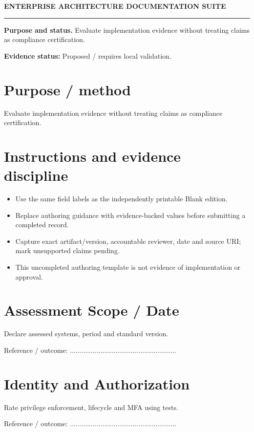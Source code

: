 \documentclass[10pt,letterpaper]{article}
\begin{document}
\begin{center}
{\large\bfseries\color{teal} ENTERPRISE ARCHITECTURE DOCUMENTATION SUITE}\par
{}\par
{}\par
\end{center}
\vspace{8pt}\hrule\vspace{12pt}
\textbf{Purpose and status.} Evaluate implementation evidence without treating claims as compliance certification.\par
\textbf{Evidence status:} Proposed / requires local validation.\par
\section{Purpose / method}
Evaluate implementation evidence without treating claims as compliance certification.\par
\section{Instructions and evidence discipline}
\begin{itemize}
\item Use the same field labels as the independently printable Blank edition.
\item Replace authoring guidance with evidence-backed values before submitting a completed record.
\item Capture exact artifact/version, accountable reviewer, date and source URI; mark unsupported claims pending.
\item This uncompleted authoring template is not evidence of implementation or approval.
\end{itemize}
\section{Assessment Scope / Date}
Declare assessed systems, period and standard version.\par
Reference / outcome: ........................................................\par
\section{Identity and Authorization}
Rate privilege enforcement, lifecycle and MFA using tests.\par
Reference / outcome: ........................................................\par
\end{document}
